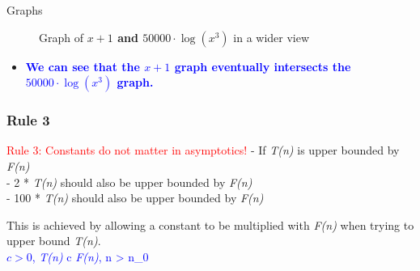 \begin{frame}{Graphs}
    \begin{figure}
        \centering
        \caption{Graph of \textbf{\( x+1 \) and \( 50000 \cdot \log(x^3) \)} in a wider view}
    \end{figure}
    \begin{itemize}
        \item \centering \textcolor{blue}{\textbf{We can see that the \( x+1 \) graph eventually intersects the \( 50000 \cdot \log(x^3) \) graph.}}
    \end{itemize}
    
\end{frame}




\begin{frame}
    \frametitle{Rule 3}
    \vspace{0.3cm} %
    \begin{block}{\textcolor{red}{Rule 3: Constants do not matter in asymptotics!}}
    \vspace{0.2cm}
    - If \textit{T(n)} is upper bounded by \textit{F(n)} \\
    - 2 * \textit{T(n)} should also be upper bounded by \textit{F(n)} \\
    - 100 * \textit{T(n)} should also be upper bounded by \textit{F(n)}
    \end{block}
    \vspace{0.2cm}
    This is achieved by allowing a constant to be multiplied with \textit{F(n)} when trying to upper bound \textit{T(n)}.\\
    \vspace{0.3cm}
    \textcolor{blue}{ $c>0$, \textit{T(n)} \leq c \cdot \textit{F(n)},  n > n_0}
\end{frame}

